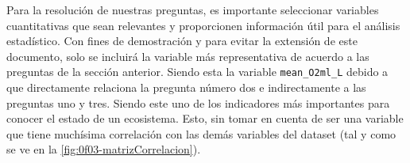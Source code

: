 
Para la resolución de nuestras preguntas, es importante seleccionar variables cuantitativas que sean relevantes y proporcionen información útil para el análisis estadístico. Con fines de demostración y para evitar la extensión de este documento, solo se incluirá la variable más representativa de acuerdo a las preguntas de la sección anterior. Siendo esta la variable \texttt{mean\_O2ml\_L} debido a que directamente relaciona la pregunta número dos e indirectamente a las preguntas uno y tres. Siendo este uno de los indicadores más importantes para conocer el estado de un ecosistema. Esto, sin tomar en cuenta de ser una variable que tiene muchísima correlación con las demás variables del dataset (tal y como se ve en la \autoref{fig:0f03-matrizCorrelacion}).